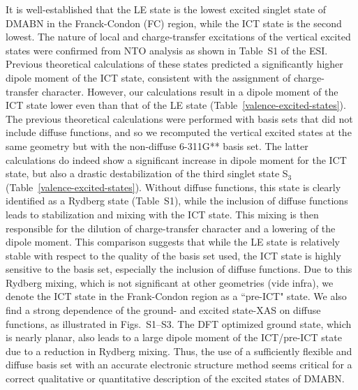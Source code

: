 \documentclass[journal=jacsat,manuscript=article]{achemso}
\begin{document}
It is well-established that the LE state is the lowest excited singlet state of DMABN in the Franck-Condon (FC) region, while the ICT state is the second lowest. The nature of local and charge-transfer excitations of the vertical excited states were confirmed from NTO analysis as shown in Table~S1 of the ESI. Previous theoretical calculations of these states predicted a significantly higher dipole moment of the ICT state, consistent with the assignment of charge-transfer character.\cite{sobolewski1998ab,parusel1999coupled,rappoport2004photoinduced,kohn2004} However, our calculations result in a dipole moment of the ICT state lower even than that of the LE state (Table~\ref{valence-excited-states}). The previous theoretical calculations were performed with basis sets that did not include diffuse functions, and so we recomputed the vertical excited states at the same geometry but with the non-diffuse 6-311G** basis set. The latter calculations do indeed show a significant increase in dipole moment for the ICT state, but also a drastic destabilization of the third singlet state S$_3$ (Table~\ref{valence-excited-states}). Without diffuse functions, this state is clearly identified as a Rydberg state (Table~S1), while the inclusion of diffuse functions leads to stabilization and mixing with the ICT state. This mixing is then responsible for the dilution of charge-transfer character and a lowering of the dipole moment. This comparison suggests that while the LE state is relatively stable with respect to the quality of the basis set used, the ICT state is highly sensitive to the basis set, especially the inclusion of diffuse functions. Due to this Rydberg mixing, which is not significant at other geometries (vide infra), we denote the ICT state in the Frank-Condon region as a ``pre-ICT" state. We also find a strong dependence of the ground- and excited state-XAS on diffuse functions, as illustrated in Figs.~S1--S3. The DFT optimized ground state, which is nearly planar, also leads to a large dipole moment of the ICT/pre-ICT state due to a reduction in Rydberg mixing. Thus, the use of a sufficiently flexible and diffuse basis set with an accurate electronic structure method seems critical for a correct qualitative or quantitative description of the excited states of DMABN.
\end{document}
